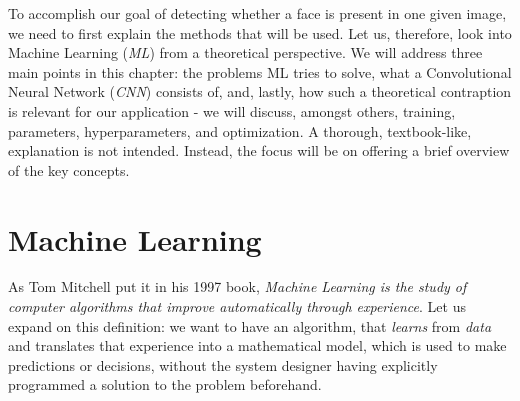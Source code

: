 To accomplish our goal of detecting whether a face is present in one given image, we need to first explain the methods that will be used. Let us, therefore, look into Machine Learning (\textit{ML}) from a theoretical perspective. We will address three main points in this chapter: the problems ML tries to solve, what a Convolutional Neural Network (\textit{CNN}) consists of, and, lastly, how such a theoretical contraption is relevant for our application - we will discuss, amongst others, training, parameters, hyperparameters, and optimization. A thorough, textbook-like, explanation is not intended. Instead, the focus will be on offering a brief overview of the key concepts.
\section{Machine Learning}
As Tom Mitchell put it in his 1997 book, \textit{Machine Learning is the study of computer algorithms that improve automatically through experience}. \cite{mitchell_ml} Let us expand on this definition: we want to have an algorithm, that \textit{learns} from \textit{data} and translates that experience into a mathematical model, which is used to make predictions or decisions, without the system designer having explicitly programmed a solution to the problem beforehand. \cite{genetic_book_96} \par


